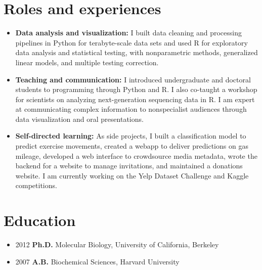 \documentclass[letterpaper,12pt]{article}
\begin{document}
\section*{Roles and experiences}
\begin{itemize}
    \item \textbf{Data analysis and visualization:} I built data cleaning and processing pipelines in Python for terabyte-scale data sets and used R for exploratory data analysis and statistical testing, with nonparametric methods, generalized linear models, and multiple testing correction.
    \item \textbf{Teaching and communication:} I introduced undergraduate and doctoral students to programming through Python and R. I also co-taught a workshop for scientists on analyzing next-generation sequencing data in R. I am expert at communicating complex information to nonspecialist audiences through data visualization and oral presentations.
    \item \textbf{Self-directed learning:} As side projects, I built a classification model to predict exercise movements, created a webapp to deliver predictions on gas mileage, developed a web interface to crowdsource media metadata, wrote the backend for a website to manage invitations, and maintained a donations website. I am currently working on the Yelp Dataset Challenge and Kaggle competitions. 
\end{itemize}

\section*{Education}
\begin{itemize}
    \item 2012 \textbf{Ph.D.} Molecular Biology, University of California, Berkeley
    \item 2007 \textbf{A.B.} Biochemical Sciences, Harvard University
\end{itemize}
\end{document}
